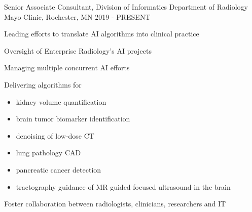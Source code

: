 

\begin{cventries}
  \cventry
      {Senior Associate Consultant, Division of Informatics} %
      {Department of Radiology} %
      {Mayo Clinic, Rochester, MN} %
      {2019 - PRESENT} %
      {
        \begin{cvitems}
        \item Leading efforts to translate AI algorithms into clinical practice
        \item Oversight of Enterprise Radiology's AI projects
        \item Managing multiple concurrent AI efforts
        \item Delivering algorithms for
        \begin{itemize}
          \item kidney volume quantification
          \item brain tumor biomarker identification
          \item denoising of low-dose CT
          \item lung pathology CAD
          \item pancreatic cancer detection
          \item tractography guidance of MR guided focused ultrasound in the brain
        \end{itemize}
        \item Foster collaboration between radiologists, clinicians, researchers and IT
        \end{cvitems}
      }
      

\end{cventries}

